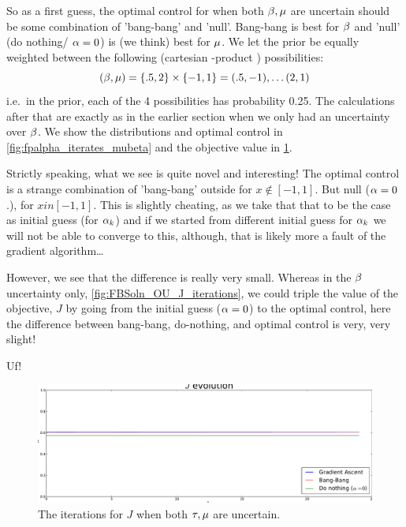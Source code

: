 So as a first guess, the optimal control for when both $\beta,{\mu }$ are uncertain
should be some combination of 'bang-bang' and 'null'. Bang-bang is best for $\beta$
and 'null' (do nothing/ $\alpha=0$) is (we think) best for ${\mu }$.
We let the prior be equally weighted between the following (cartesian
-product ) possibilities:
$$
(\beta, {\mu }) =\{.5, 2\} \times \{-1,1\} = (.5,-1), \ldots (2,1)
$$
i.e.\ in the prior, each of the 4 possibilities has probability
0.25. The calculations after that are exactly as in the earlier section when we only had
an uncertainty over $\beta$. We show the distributions and optimal control in
\cref{fig:fpalpha_iterates_mubeta} and the objective value in
\cref{fig:OU_mubeta_Jiterates}. 

Strictly speaking, what we see is quite novel and interesting! The optimal
control is a strange combination of 'bang-bang' outside for  $x \notin [-1,1]$.
But null ($\alpha=0$.), for $x in [-1,1]$. This is slightly cheating, as we take
that that to be the case as initial guess (for $\alpha_k$) and if we started from
different initial guess for $\alpha_k$ we will not be able to converge to this,
although, that is likely more a fault of the gradient algorithm\ldots

However, we see that the difference is really very small. Whereas in the $\beta$
uncertainty only, \cref{fig:FBSoln_OU_J_iterations}, we could triple the value
of the objective, $J$ by going from the initial guess ($\alpha=0$) to the optimal
control, here the difference between bang-bang, do-nothing, and optimal control
is very, very slight!

Uf!


\begin{figure}[htp]
\begin{center}
  \includegraphics[width=1\textwidth]{Figs/OUFBSolver_BetaMu/FB_J_iterates_uICs_Tf=2.pdf}
  \caption[tableofCs]{The iterations for $J$ when both ${ \tau }, {\mu }$ are
  uncertain.}
  \label{fig:OU_mubeta_Jiterates}
\end{center}
\end{figure}

